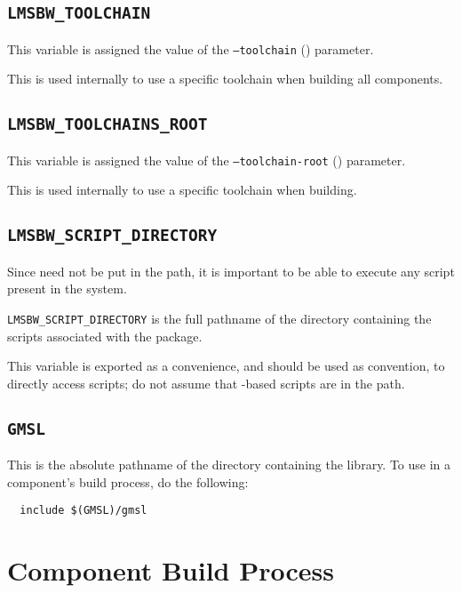 \subsection{\texttt{LMSBW\_TOOLCHAIN}}

This variable is assigned the value of the \texttt{--toolchain}
() parameter.

This is used internally to use a specific toolchain when building all
components.

\subsection{\texttt{LMSBW\_TOOLCHAINS\_ROOT}}

This variable is assigned the value of the \texttt{--toolchain-root}
() parameter.

This is used internally to use a specific toolchain when building.

\subsection{\texttt{LMSBW\_SCRIPT\_DIRECTORY}}

Since \lmsbw need not be put in the path, it is important to be able
to execute any script present in the \lmsbw system.

\texttt{LMSBW\_SCRIPT\_DIRECTORY} is the full pathname of the
directory containing the scripts associated with the \lmsbw package.

This variable is exported as a convenience, and should be used as
convention, to directly access scripts; do not assume that
\lmsbw-based scripts are in the path.

\subsection{\texttt{GMSL}}

This is the absolute pathname of the directory containing the \gmsl
library.  To use \gmsl in a component's build process, do the
following:

\begin{verbatim}
  include $(GMSL)/gmsl
\end{verbatim}

\section{Component Build Process}

